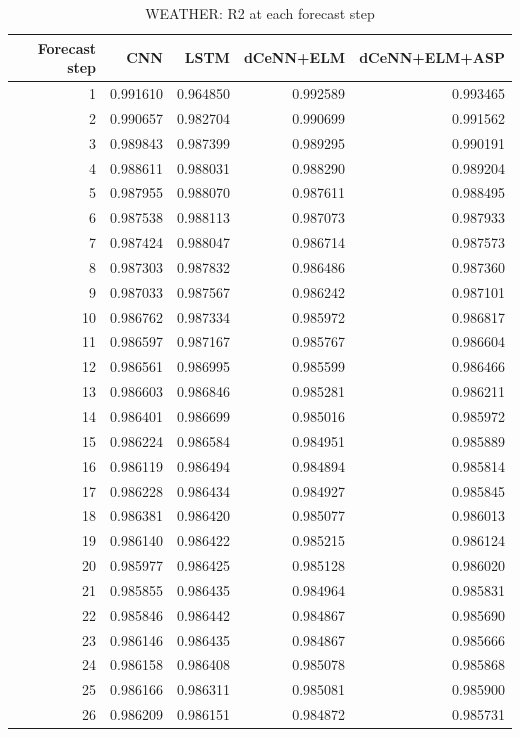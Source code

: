 \begin{table}
\caption{WEATHER: R2 at each forecast step}
\begin{tabular}{rrrrr}
\toprule
Forecast step & CNN & LSTM & dCeNN+ELM & dCeNN+ELM+ASP \\
\midrule
1 & 0.991610 & 0.964850 & 0.992589 & 0.993465 \\
2 & 0.990657 & 0.982704 & 0.990699 & 0.991562 \\
3 & 0.989843 & 0.987399 & 0.989295 & 0.990191 \\
4 & 0.988611 & 0.988031 & 0.988290 & 0.989204 \\
5 & 0.987955 & 0.988070 & 0.987611 & 0.988495 \\
6 & 0.987538 & 0.988113 & 0.987073 & 0.987933 \\
7 & 0.987424 & 0.988047 & 0.986714 & 0.987573 \\
8 & 0.987303 & 0.987832 & 0.986486 & 0.987360 \\
9 & 0.987033 & 0.987567 & 0.986242 & 0.987101 \\
10 & 0.986762 & 0.987334 & 0.985972 & 0.986817 \\
11 & 0.986597 & 0.987167 & 0.985767 & 0.986604 \\
12 & 0.986561 & 0.986995 & 0.985599 & 0.986466 \\
13 & 0.986603 & 0.986846 & 0.985281 & 0.986211 \\
14 & 0.986401 & 0.986699 & 0.985016 & 0.985972 \\
15 & 0.986224 & 0.986584 & 0.984951 & 0.985889 \\
16 & 0.986119 & 0.986494 & 0.984894 & 0.985814 \\
17 & 0.986228 & 0.986434 & 0.984927 & 0.985845 \\
18 & 0.986381 & 0.986420 & 0.985077 & 0.986013 \\
19 & 0.986140 & 0.986422 & 0.985215 & 0.986124 \\
20 & 0.985977 & 0.986425 & 0.985128 & 0.986020 \\
21 & 0.985855 & 0.986435 & 0.984964 & 0.985831 \\
22 & 0.985846 & 0.986442 & 0.984867 & 0.985690 \\
23 & 0.986146 & 0.986435 & 0.984867 & 0.985666 \\
24 & 0.986158 & 0.986408 & 0.985078 & 0.985868 \\
25 & 0.986166 & 0.986311 & 0.985081 & 0.985900 \\
26 & 0.986209 & 0.986151 & 0.984872 & 0.985731 \\

\end{tabular}
\end{table}
